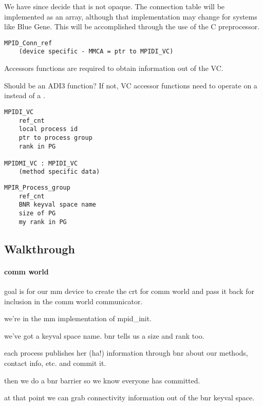 We have since decide that  is not opaque.  The connection table
will be implemented as an array, although that implementation may change for
systems like Blue Gene.  This will be accomplished through the use of the C
preprocessor.

\begin{verbatim}
MPID_Conn_ref
    (device specific - MMCA = ptr to MPIDI_VC)
\end{verbatim}

Accessors functions are required to obtain information out of the VC.  

\Q Should  be an ADI3 function?  If not, VC accessor
functions need to operate on a  instead of a
.

\begin{verbatim}
MPIDI_VC
    ref_cnt
    local process id
    ptr to process group
    rank in PG

MPIDMI_VC : MPIDI_VC
    (method specific data)
\end{verbatim}

\begin{verbatim}
MPIR_Process_group
    ref_cnt
    BNR keyval space name
    size of PG
    my rank in PG
\end{verbatim}



\subsection{Walkthrough}

\paragraph{comm world}

goal is for our mm device to create the crt for comm world and pass it back for
inclusion in the comm world communicator.

we're in the mm implementation of mpid_init.

we've got a keyval space name.  bnr tells us a size and rank too.

each process publishes her (ha!) information through bnr about our methods,
contact info, etc. and commit it.

then we do a bnr barrier so we know everyone has committed.

at that point we can grab connectivity information out of the bnr keyval space.

